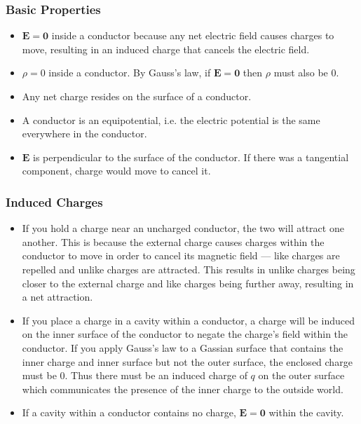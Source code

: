 \documentclass{article}
\renewcommand{\vec}[1]{\boldsymbol{\mathbf{#1}}}
\begin{document}
\subsubsection{Basic Properties}

\begin{itemize}
  \item $\vec{E} = \vec{0}$ inside a conductor because any net electric field causes charges to move, resulting in an induced charge that cancels the electric field.

  \item $\rho = 0$ inside a conductor. By Gauss's law, if $\vec{E} = \vec{0}$ then $\rho$ must also be $0$.

  \item Any net charge resides on the surface of a conductor.

  \item A conductor is an equipotential, i.e. the electric potential is the same everywhere in the conductor.

  \item $\vec{E}$ is perpendicular to the surface of the conductor. If there was a tangential component, charge would move to cancel it.
\end{itemize}

\subsubsection{Induced Charges}

\begin{itemize}
  \item If you hold a charge near an uncharged conductor, the two will attract one another. This is because the external charge causes charges within the conductor to move in order to cancel its magnetic field — like charges are repelled and unlike charges are attracted. This results in unlike charges being closer to the external charge and like charges being further away, resulting in a net attraction.

  \item If you place a charge in a cavity within a conductor, a charge will be induced on the inner surface of the conductor to negate the charge's field within the conductor. If you apply Gauss's law to a Gassian surface that contains the inner charge and inner surface but not the outer surface, the enclosed charge must be $0$. Thus there must be an induced charge of $q$ on the outer surface which communicates the presence of the inner charge to the outside world.

  \item If a cavity within a conductor contains no charge, $\vec{E} = \vec{0}$ within the cavity.
\end{itemize}
\end{document}
